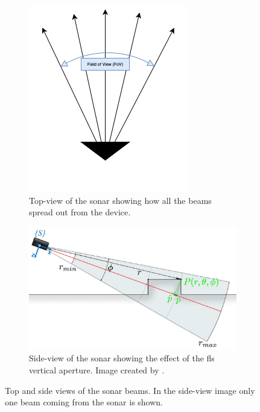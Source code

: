 \begin{figure}[H]
    \centering
    \begin{subfigure}[b]{.35\textwidth}
        \centering
        \includegraphics[width=\textwidth]{figures/FLS-TopView.png}
        \caption{Top-view of the sonar showing how all the beams spread out from the device.}
        \label{fig:flstop}
    \end{subfigure}
    \hfill
    \begin{subfigure}[b]{.55\textwidth}
        \centering
        \includegraphics[width=\textwidth]{figures/FLS.png}
        \caption{Side-view of the sonar showing the effect of the \acrshort{fls} vertical aperture. Image created by \citeauthor{Hurtos2015} \cite{Hurtos2015}.}
        \label{fig:flsaperture}
    \end{subfigure}
    \caption{Top and side views of the sonar beams. In the side-view image only one beam coming from the sonar is shown.}
\end{figure}


